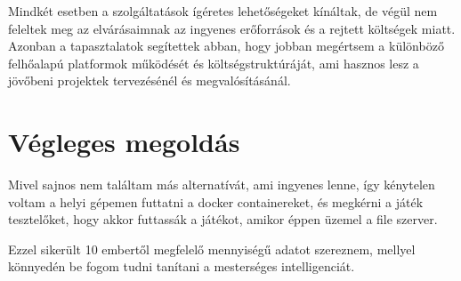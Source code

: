 Mindkét esetben a szolgáltatások ígéretes lehetőségeket kínáltak, de végül nem feleltek meg az elvárásaimnak az ingyenes erőforrások és a rejtett költségek miatt. Azonban a tapasztalatok segítettek abban, hogy jobban megértsem a különböző felhőalapú platformok működését és költségstruktúráját, ami hasznos lesz a jövőbeni projektek tervezésénél és megvalósításánál.
\section{Végleges megoldás}
Mivel sajnos nem találtam más alternatívát, ami ingyenes lenne, így kénytelen voltam a helyi gépemen futtatni a docker containereket, és megkérni a játék tesztelőket, hogy akkor futtassák a játékot, amikor éppen üzemel a file szerver. 

Ezzel sikerült 10 embertől megfelelő mennyiségű adatot szereznem, mellyel könnyedén be fogom tudni tanítani a mesterséges intelligenciát.